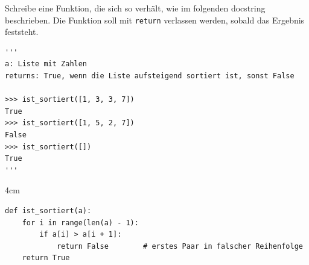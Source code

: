 \question[3]
Schreibe eine Funktion, die sich so verhält, wie im folgenden docstring beschrieben.
Die Funktion soll mit \texttt{return} verlassen werden, sobald das Ergebnis feststeht.
\begin{lstlisting}
'''
a: Liste mit Zahlen
returns: True, wenn die Liste aufsteigend sortiert ist, sonst False

>>> ist_sortiert([1, 3, 3, 7])
True
>>> ist_sortiert([1, 5, 2, 7])
False
>>> ist_sortiert([])
True
'''
\end{lstlisting}

\begin{solutionbox}{4cm}
\begin{lstlisting}
def ist_sortiert(a):
    for i in range(len(a) - 1):
        if a[i] > a[i + 1]:
            return False        # erstes Paar in falscher Reihenfolge
    return True
\end{lstlisting}
\end{solutionbox}
